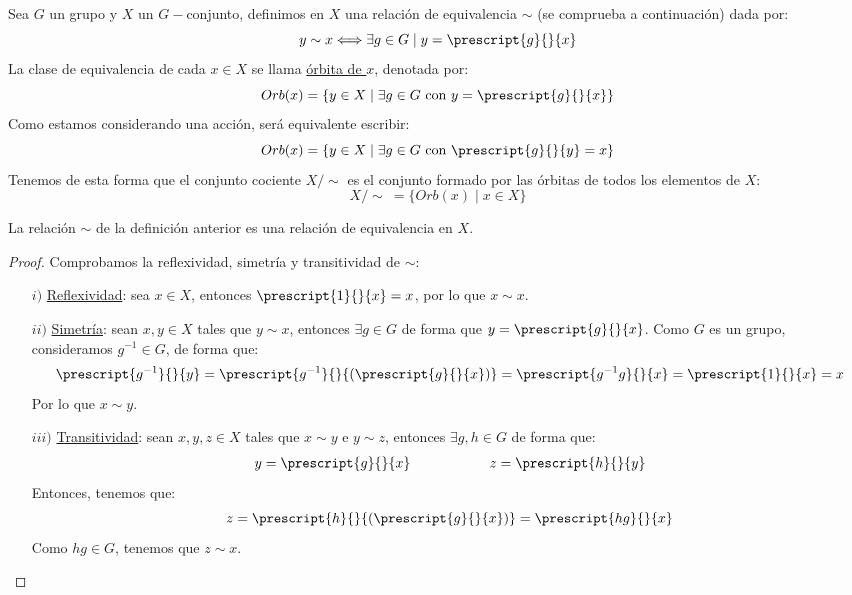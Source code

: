\begin{definicion}[Órbita]
    Sea $G$ un grupo y $X$ un $G-$conjunto, definimos en $X$ una relación de equivalencia $\sim$ (se comprueba a continuación) dada por:
    \begin{equation*}
        y\sim x \Longleftrightarrow \exists g\in G \mid y = \prescript{g}{}{x}
    \end{equation*}
    La clase de equivalencia de cada $x\in X$ se llama \underline{órbita de $x$}, denotada por:
    \begin{equation*}
        Orb(x) = \{y\in X \mid \exists g\in G \text{\ con\ } y=\prescript{g}{}{x}\}
    \end{equation*}
    Como estamos considerando una acción, será equivalente escribir:
    \begin{equation*}
        Orb(x) = \{y\in X\mid \exists g\in G \text{\ con\ } \prescript{g}{}{y} = x\}
    \end{equation*}
    Tenemos de esta forma que el conjunto cociente $X/\sim$ es el conjunto formado por las órbitas de todos los elementos de $X$:
    \begin{equation*}
        X/\sim\ = \{Orb(x) \mid x\in X\}
    \end{equation*}
\end{definicion}
\begin{prop}
    La relación $\sim$ de la definición anterior es una relación de equivalencia en $X$.
    \begin{proof}
        Comprobamos la reflexividad, simetría y transitividad de $\sim$:
        \begin{itemize}
            \item[$i)$] \ul{Reflexividad}: sea $x\in X$, entonces $\prescript{1}{}{x} = x$, por lo que $x\sim x$.
            \item[$ii)$] \ul{Simetría}: sean $x,y\in X$ tales que $y\sim x$, entonces $\exists g\in G$ de forma que $y = \prescript{g}{}{x}$. Como $G$ es un grupo, consideramos $g^{-1}\in G$, de forma que:
                \begin{equation*}
                    \prescript{g^{-1}}{}{y} = \prescript{g^{-1}}{}{(\prescript{g}{}{x})} = \prescript{g^{-1}g}{}{x} = \prescript{1}{}{x} = x
                \end{equation*}
            Por lo que $x\sim y$.
            \item[$iii)$] \ul{Transitividad}: sean $x,y,z\in X$ tales que $x\sim y$ e $y\sim z$, entonces $\exists g,h\in G$ de forma que:
                \begin{align*}
                    y = \prescript{g}{}{x} \hspace{2cm}
                    z = \prescript{h}{}{y}
                \end{align*}
                Entonces, tenemos que:
                \begin{equation*}
                    z = \prescript{h}{}{(\prescript{g}{}{x})} = \prescript{hg}{}{x}
                \end{equation*}
                Como $hg\in G$, tenemos que $z\sim x$.\qedhere
        \end{itemize}
    \end{proof}
\end{prop}

